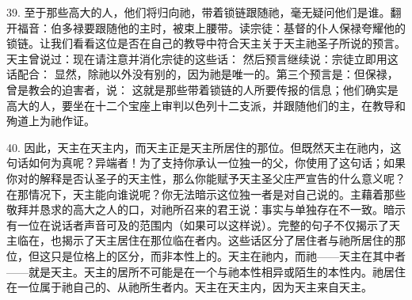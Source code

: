 39. 至于那些高大的人，他们将归向祂，带着锁链跟随祂，毫无疑问他们是谁。翻开福音：伯多禄要跟随他的主时，被束上腰带。读宗徒：基督的仆人保禄夸耀他的锁链。让我们看看这位是否在自己的教导中符合天主关于天主祂圣子所说的预言。天主曾说过：现在请注意并消化宗徒的这些话： 然后预言继续说：宗徒立即用这话配合： 显然，除祂以外没有别的，因为祂是唯一的。第三个预言是：但保禄，曾是教会的迫害者，说： 这就是那些带着锁链的人所要传报的信息；他们确实是高大的人，要坐在十二个宝座上审判以色列十二支派，并跟随他们的主，在教导和殉道上为祂作证。\par

40. 因此，天主在天主内，而天主正是天主所居住的那位。但既然天主在祂内，这句话如何为真呢？异端者！为了支持你承认一位独一的父，你使用了这句话；如果你对的解释是否认圣子的天主性，那么你能赋予天主圣父庄严宣告的什么意义呢？在那情况下，天主能向谁说呢？你无法暗示这位独一者是对自己说的。主藉着那些敬拜并恳求的高大之人的口，对祂所召来的君王说：事实与单独存在不一致。暗示有一位在说话者声音可及的范围内（如果可以这样说）。完整的句子不仅揭示了天主临在，也揭示了天主居住在那位临在者内。这些话区分了居住者与祂所居住的那位，但这只是位格上的区分，而非本性上的。天主在祂内，而祂——天主在其中者——就是天主。天主的居所不可能是在一个与祂本性相异或陌生的本性内。祂居住在一位属于祂自己的、从祂所生者内。天主在天主内，因为天主来自天主。\par

